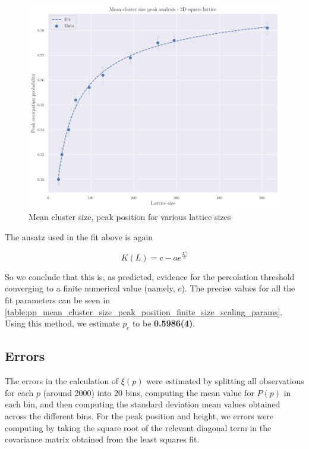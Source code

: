\begin{figure}[H]
  \includegraphics[width=\linewidth]{Images/sim_mean_cluster_size_peak_position.png}
  \caption{Mean cluster size, peak position for various lattice sizes}
  \label{fig:sim_mean_cluster_size_peak_position}
\end{figure}


The ansatz used in the fit above is again

$$ 
    K(L) = c - a e^{\frac{L^n}{b}}
$$

So we conclude that this is, as predicted, evidence for the percolation threshold converging to a finite numerical value (namely, $c$). The precise values for all the fit parameters can be seen in \autoref{table:pp_mean_cluster_size_peak_position_finite_size_scaling_params}. Using this method, we estimate $p_c$ to be \textbf{0.5986(4)}. 

\subsection{Errors}
\label{sec:error_mean_clust_size}

The errors in the calculation of $\xi(p)$ were estimated by splitting all observations for each $p$ (around 2000) into 20 bins, computing the mean value for $P(p)$ in each bin, and then computing the standard deviation mean values obtained across the different bins. For the peak position and height, we errors were computing by taking the square root of the relevant diagonal term in the covariance matrix obtained from the least squares fit.

